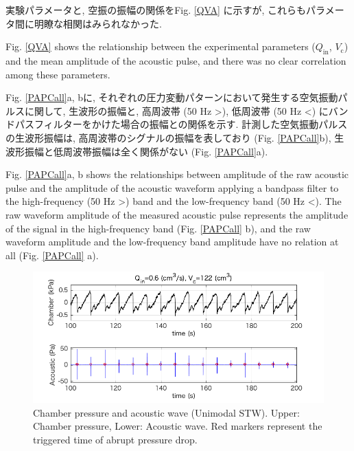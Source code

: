 \documentclass[12pt]{article}
\begin{document}
実験パラメータと, 空振の振幅の関係をFig. \ref{QVA} に示すが, これらもパラメータ間に明瞭な相関はみられなかった.

Fig. \ref{QVA} shows the relationship between the experimental parameters ($Q_\mathrm{in}$, $V_\mathrm{c}$) and the mean amplitude of the acoustic pulse, and there was no clear correlation among these parameters.

Fig. \ref{PAPCall}a, bに, それぞれの圧力変動パターンにおいて発生する空気振動パルスに関して, 生波形の振幅と, 高周波帯 (50 Hz >), 低周波帯 (50 Hz <) にバンドパスフィルターをかけた場合の振幅との関係を示す. 
計測した空気振動パルスの生波形振幅は, 高周波帯のシグナルの振幅を表しており (Fig. \ref{PAPCall}b), 生波形振幅と低周波帯振幅は全く関係がない (Fig. \ref{PAPCall}a).

Fig. \ref{PAPCall}a, b shows the relationships between amplitude of the raw acoustic pulse and the amplitude of the acoustic waveform applying a bandpass filter to the high-frequency (50 Hz >) band and the low-frequency band (50 Hz <).
The raw waveform amplitude of the measured acoustic pulse represents the amplitude of the signal in the high-frequency band (Fig. \ref {PAPCall} b), and the raw waveform amplitude and the low-frequency band amplitude have no relation at all (Fig. \ref{PAPCall} a).

\clearpage
\begin{figure}[H]
\begin{center}
\includegraphics[scale=1] {MonoPAtime.png} 
\caption{Chamber pressure and acoustic wave (Unimodal STW). Upper: Chamber pressure, Lower: Acoustic wave. Red markers represent the triggered time of abrupt pressure drop.}
\label{MonoPAtime}
\end{center}
\end{figure} 
\end{document}
